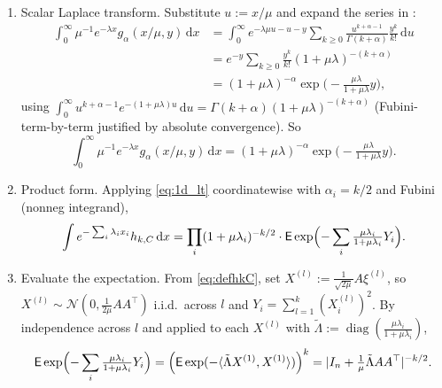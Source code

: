 \documentclass[14pt]{extarticle}
\makeatletter
\theoremstyle{definition}
\renewenvironment{proof}[1][\proofname]{\par
  \pushQED{\qed}%
  \normalfont \topsep6\p@\@plus6\p@\relax
  \trivlist
  \item[\hskip\labelsep\bfseries #1\@addpunct{.}]\ignorespaces
}{%
  \popQED\endtrivlist\@endpefalse
}
\newcommand{\EE}{\mathsf{E}}
\newcommand{\diag}{\operatorname{diag}}
\newcommand{\dd}{\mathrm{d}}
\newcommand{\caln}{\mathcal{N}}
\makeatother
\begin{document}
\begin{proof}
  \leavevmode
  \begin{enumerate}
    \item Scalar Laplace transform.  Substitute $u:=x/\mu$ and expand
      the series in :
      \begin{align*}
        \int_0^\infty\mu^{-1}e^{-\lambda x}g_\alpha(x/\mu,y)\,\dd x
        &=\int_0^\infty e^{-\lambda\mu u-u-y}
          \sum_{k\geqslant 0}\tfrac{u^{k+\alpha-1}}{\Gamma(k+\alpha)}
          \tfrac{y^k}{k!}\,\dd u\\
        &=e^{-y}\sum_{k\geqslant 0}\tfrac{y^k}{k!}(1+\mu\lambda)^{-(k+\alpha)}\\
        &=(1+\mu\lambda)^{-\alpha}\exp\bigl(-\tfrac{\mu\lambda}{1+\mu\lambda}y\bigr),
      \end{align*}
      using $\int_0^\infty u^{k+\alpha-1}e^{-(1+\mu\lambda)u}\,\dd u
      =\Gamma(k+\alpha)(1+\mu\lambda)^{-(k+\alpha)}$ (Fubini-term-by-term
      justified by absolute convergence).  So
      \begin{equation}\label{eq:1d_lt}
        \int_0^\infty\mu^{-1}e^{-\lambda x}g_\alpha(x/\mu,y)\,\dd x
        =(1+\mu\lambda)^{-\alpha}\exp\bigl(-\tfrac{\mu\lambda}{1+\mu\lambda}y\bigr).
      \end{equation}

    \item Product form.  Applying \eqref{eq:1d_lt} coordinatewise with
      $\alpha_i=k/2$ and Fubini (nonneg integrand),
      \begin{equation}\label{eq:hkC_step1}
        \int e^{-\sum_i\lambda_ix_i}h_{k,C}\,\dd x
        =\prod_i(1+\mu\lambda_i)^{-k/2}\cdot
        \EE\exp\Bigl(-\sum_i\tfrac{\mu\lambda_i}{1+\mu\lambda_i}Y_i\Bigr).
      \end{equation}

    \item Evaluate the expectation.  From \eqref{eq:defhkC}, set
      $X^{(l)}:=\tfrac{1}{\sqrt{2\mu}}A\xi^{(l)}$, so
      $X^{(l)}\sim\caln(0,\tfrac{1}{2\mu}AA^\top)$ i.i.d.\ across $l$
      and $Y_i=\sum_{l=1}^k(X_i^{(l)})^2$.  By independence across $l$
      and  applied to each $X^{(l)}$ with
      $\tilde\Lambda:=\diag(\tfrac{\mu\lambda_i}{1+\mu\lambda_i})$,
      \[
        \EE\exp\Bigl(-\sum_i\tfrac{\mu\lambda_i}{1+\mu\lambda_i}Y_i\Bigr)
        =\Bigl(\EE\exp(-\langle\tilde\Lambda X^{(1)},X^{(1)}\rangle)\Bigr)^k
        =|I_n+\tfrac{1}{\mu}\tilde\Lambda AA^\top|^{-k/2}.
      \]


\end{enumerate}
\end{proof}
\end{document}
